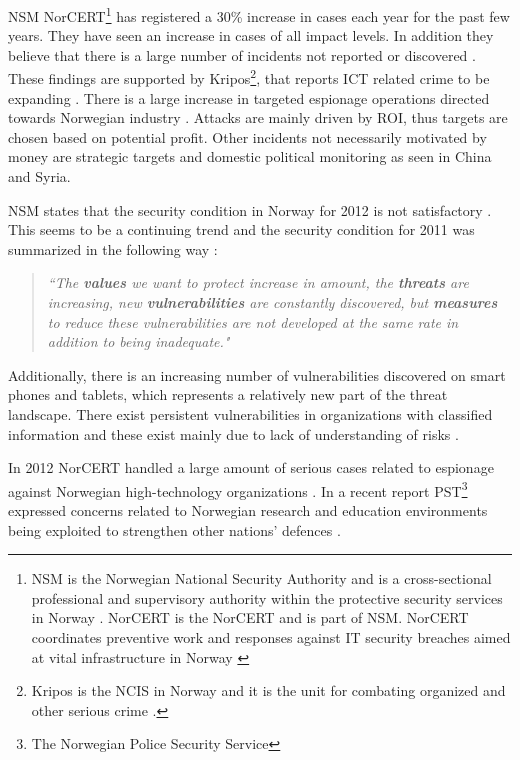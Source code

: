 \acs{NSM} \acs{NorCERT}\footnote{\acs{NSM} is the Norwegian National Security Authority and is a cross-sectional professional and supervisory authority within the protective security services in Norway \cite{AboutNSM}. \acs{NorCERT} is the \acl{NorCERT} and is part of \acs{NSM}. \acs{NorCERT} coordinates preventive work and responses against IT security breaches aimed at vital infrastructure in Norway \cite{AboutNorCERT}} has registered a 30\% increase in cases each year for the past few years. They have seen an increase in cases of all impact levels. In addition they believe that there is a large number of incidents not reported or discovered \cite{NorCERT3Kvartal2012}. These findings are supported by Kripos\footnote{Kripos is the \ac{NCIS} in Norway and it is the unit for combating organized and other serious crime \cite{policeInNorway}.}, that reports ICT related crime to be expanding \cite{KriposTrender}. There is a large increase in targeted espionage operations directed towards Norwegian industry \cite{NSMRapport2012}. Attacks are mainly driven by \ac{ROI}, thus targets are chosen based on potential profit. Other incidents not necessarily motivated by money are strategic targets and domestic political monitoring as seen in China and Syria\cite{Morketall2012}.

\acs{NSM} states that the security condition in Norway for 2012 is not satisfactory \cite{samordnaVurdering}. This seems to be a continuing trend and the security condition for 2011 was summarized in the following way \cite{NSMRapport}: 

\begin{quote}
\textit{``The \textbf{values} we want to protect increase in amount, the \textbf{threats} are increasing, new \textbf{vulnerabilities} are constantly discovered, but \textbf{measures} to reduce these vulnerabilities are not developed at the same rate in addition to being inadequate."}
\end{quote}

Additionally, there is an increasing number of vulnerabilities discovered on smart phones and tablets, which represents a relatively new part of the threat landscape. There exist persistent vulnerabilities in organizations with classified information and these exist mainly due to lack of understanding of risks \cite{NSMRapport2012}.

In 2012 \acs{NorCERT} handled a large amount of serious cases related to espionage against Norwegian high-technology organizations \cite{NorCERT3Kvartal2012}. In a recent report PST\footnote{The Norwegian Police Security Service} expressed concerns related to Norwegian research and education environments being exploited to strengthen other nations' defences \cite{PSTvurdering2013}.   

